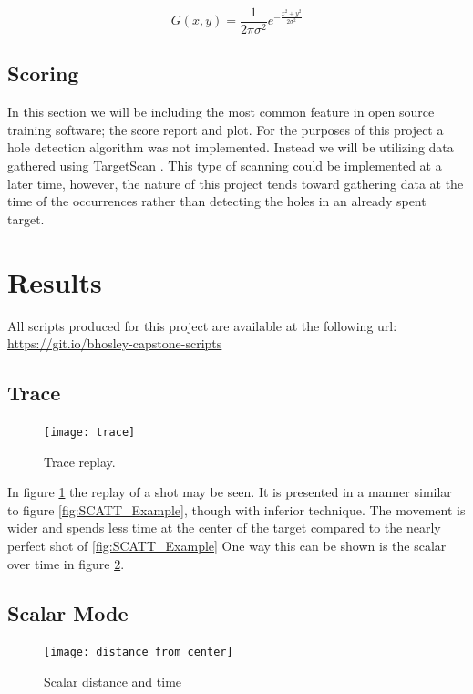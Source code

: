 \documentclass[conference]{IEEEtran}
\begin{document}
\begin{equation}\label{gaussian_filter}
	G(x,y) = \frac{1}{2 \pi \sigma^2} e^{ -\frac{x^2+y^2}{2\sigma^2} }
\end{equation}

\subsection{Scoring}

In this section we will be including the most common feature in open source training software; the score report and plot.
For the purposes of this project a hole detection algorithm was not implemented.
Instead we will be utilizing data gathered using TargetScan \cite{targetscan}.
This type of scanning could be implemented at a later time, however,
the nature of this project tends toward gathering data at the time of the occurrences rather than detecting the holes in an already spent target.


\section{Results}

All scripts produced for this project are available at the following url: \href{https://git.io/bhosley-capstone-scripts}{https://git.io/bhosley-capstone-scripts}

\subsection{Trace}

\begin{figure}[]
	\centering
	\texttt{[image: trace]}
	\caption{Trace replay.}
	\label{fig:trace}
\end{figure}

In figure \ref{fig:trace} the replay of a shot may be seen.
It is presented in a manner similar to figure \ref{fig:SCATT_Example}, 
though with inferior technique.
The movement is wider and spends less time at the center of the target compared to the nearly perfect shot of  \ref{fig:SCATT_Example}
One way this can be shown is the scalar over time in figure \ref{fig:dfc}.

\subsection{Scalar Mode}

\begin{figure}[]
	\centering
	\texttt{[image: distance\_from\_center]}
	\caption{Scalar distance and time}
	\label{fig:dfc}
\end{figure}
\end{document}
